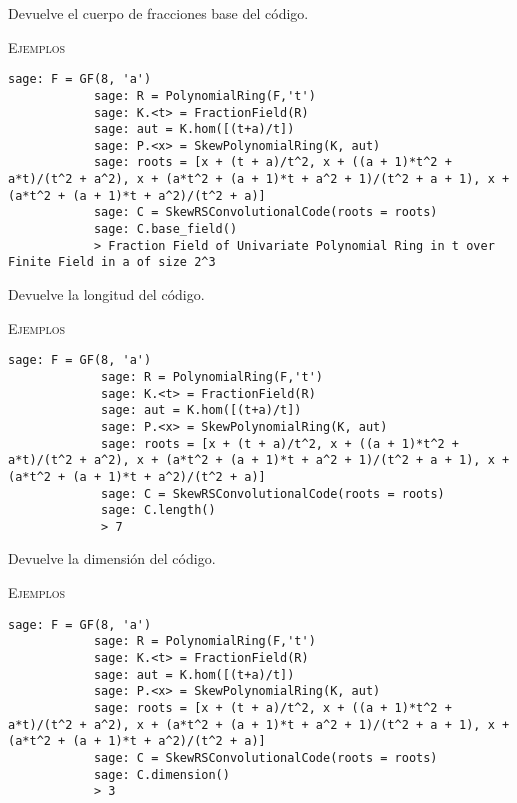 \begin{description}[leftmargin=1em, font=\normalfont\ttfamily, style=nextline]
    \begin{description}[font=\ttfamily,style=nextline]
        \item[base\_field(self)] 
        Devuelve el cuerpo de fracciones base del código.

        \textsc{Ejemplos}

        \begin{lstlisting}[gobble=12]
            sage: F = GF(8, 'a')
            sage: R = PolynomialRing(F,'t')
            sage: K.<t> = FractionField(R)
            sage: aut = K.hom([(t+a)/t])
            sage: P.<x> = SkewPolynomialRing(K, aut)
            sage: roots = [x + (t + a)/t^2, x + ((a + 1)*t^2 + a*t)/(t^2 + a^2), x + (a*t^2 + (a + 1)*t + a^2 + 1)/(t^2 + a + 1), x + (a*t^2 + (a + 1)*t + a^2)/(t^2 + a)]
            sage: C = SkewRSConvolutionalCode(roots = roots) 
            sage: C.base_field()
            > Fraction Field of Univariate Polynomial Ring in t over Finite Field in a of size 2^3
        \end{lstlisting} 
    \end{description}
    \begin{description}[font=\ttfamily,style=nextline]
        \item[length(self)]
         Devuelve la longitud del código.

         \textsc{Ejemplos}

         \begin{lstlisting}[gobble=12]
             sage: F = GF(8, 'a')
             sage: R = PolynomialRing(F,'t')
             sage: K.<t> = FractionField(R)
             sage: aut = K.hom([(t+a)/t])
             sage: P.<x> = SkewPolynomialRing(K, aut)
             sage: roots = [x + (t + a)/t^2, x + ((a + 1)*t^2 + a*t)/(t^2 + a^2), x + (a*t^2 + (a + 1)*t + a^2 + 1)/(t^2 + a + 1), x + (a*t^2 + (a + 1)*t + a^2)/(t^2 + a)]
             sage: C = SkewRSConvolutionalCode(roots = roots) 
             sage: C.length()
             > 7
         \end{lstlisting} 
    \end{description}
    \begin{description}[font=\ttfamily,style=nextline]
        \item[dimension(self)] 
        Devuelve la dimensión del código.
    
        \textsc{Ejemplos}

        \begin{lstlisting}[gobble=12]
            sage: F = GF(8, 'a')
            sage: R = PolynomialRing(F,'t')
            sage: K.<t> = FractionField(R)
            sage: aut = K.hom([(t+a)/t])
            sage: P.<x> = SkewPolynomialRing(K, aut)
            sage: roots = [x + (t + a)/t^2, x + ((a + 1)*t^2 + a*t)/(t^2 + a^2), x + (a*t^2 + (a + 1)*t + a^2 + 1)/(t^2 + a + 1), x + (a*t^2 + (a + 1)*t + a^2)/(t^2 + a)]
            sage: C = SkewRSConvolutionalCode(roots = roots) 
            sage: C.dimension()
            > 3
        \end{lstlisting} 
    \end{description}


\end{description}
